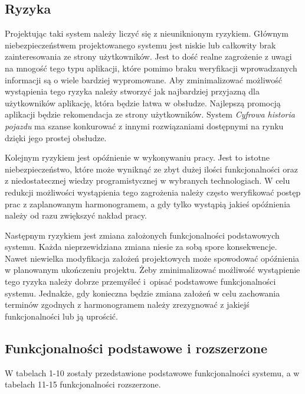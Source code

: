 \documentclass[12pt]{article}
\begin{document}
\subsection{Ryzyka}
Projektując taki system należy liczyć się z nieuniknionym ryzykiem. Głównym niebezpieczeństwem projektowanego systemu jest niskie lub całkowity brak zainteresowania ze strony użytkowników. Jest to dość realne zagrożenie z uwagi na mnogość tego typu aplikacji, które pomimo braku weryfikacji wprowadzanych informacji są o wiele bardziej wypromowane. Aby zminimalizować możliwość wystąpienia tego ryzyka należy stworzyć jak najbardziej przyjazną dla użytkowników aplikację, która będzie łatwa w obsłudze. Najlepszą promocją aplikacji będzie rekomendacja ze strony użytkowników. System \textit{ Cyfrowa historia pojazdu} ma szanse konkurować z innymi rozwiązaniami dostępnymi na rynku dzięki jego prostej obsłudze.

Kolejnym ryzykiem jest opóźnienie w wykonywaniu pracy. Jest to istotne niebezpieczeństwo, które może wyniknąć ze zbyt dużej ilości funkcjonalności oraz z niedostatecznej wiedzy programistycznej w wybranych technologiach. W celu redukcji możliwości wystąpienia tego zagrożenia należy często weryfikować postęp prac z zaplanowanym harmonogramem, a gdy tylko wystąpią jakieś opóźnienia należy od razu zwiększyć nakład pracy.

Następnym ryzykiem jest zmiana założonych funkcjonalności podstawowych systemu. Każda nieprzewidziana zmiana niesie za sobą spore konsekwencje. Nawet niewielka modyfikacja założeń projektowych może spowodować opóźnienia w planowanym ukończeniu projektu. Żeby zminimalizować możliwość wystąpienie tego ryzyka należy dobrze przemyśleć i~opisać podstawowe funkcjonalności systemu. Jednakże, gdy konieczna będzie zmiana założeń w celu zachowania terminów zgodnych z harmonogramem należy zrezygnować z jakiejś funkcjonalności lub ją uprościć.

\subsection{Funkcjonalności podstawowe i rozszerzone}

W tabelach 1-10 zostały przedstawione podstawowe funkcjonalności systemu, a w tabelach 11-15 funkcjonalności rozszerzone.
\end{document}
